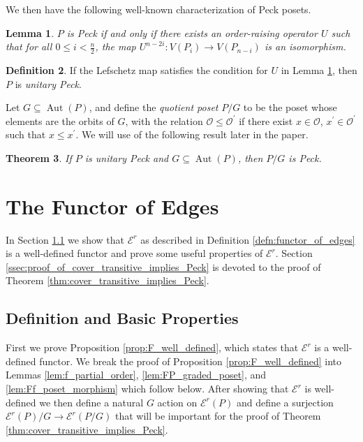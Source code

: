 \documentclass[10 pt]{amsart}
\theoremstyle{plain}
\newtheorem{thm}{Theorem}[section]
\newtheorem{lem}[thm]{Lemma}
\theoremstyle{definition}
\newtheorem{defn}[thm]{Definition}
\theoremstyle{remark}
\numberwithin{equation}{section}
\newcommand\ssec{\subsection}
\begin{document}
\noindent We then have the following well-known characterization of Peck posets.

\begin{lem}\label{lem:Peck_poset_characterization}
$P$ is Peck if and only if there exists an order-raising operator $U$ such that for all $0\le i < \frac{n}{2}$, the map $U^{n-2i}\colon V(P_i)\rightarrow V(P_{n-i})$ is an isomorphism.
\end{lem}

\begin{defn}
If the Lefschetz map satisfies the condition for $U$ in Lemma \ref{lem:Peck_poset_characterization}, then $P$ is \textit{unitary Peck}.
\end{defn}


Let $G\subseteq \operatorname{Aut}(P)$, and define the \textit{quotient poset} $P/G$ to be the poset whose elements are the orbits of $G$, with the relation $\mathcal{O}\le \mathcal{O}^\prime$ if there exist $x\in \mathcal{O}$, $x^\prime\in \mathcal{O}^\prime$ such that $x\le x^\prime$.  We will use of the following result later in the paper.

\begin{thm}
\label{thm:quotients_of_unitary_peck_posets}
If $P$ is unitary Peck and $G\subseteq\operatorname{Aut}(P)$, then $P/G$ is Peck.
\end{thm}



\section{The Functor of Edges}
\label{sec:functor_of_edges}

In Section \ref{ssec:definition_and_basic_properties} we show that $\mathcal E^r$ as described in Definition \ref{defn:functor_of_edges} is a well-defined functor and prove some useful properties of $\mathcal E^r$.  Section \ref{ssec:proof_of_cover_transitive_implies_Peck} is devoted to the proof of Theorem \ref{thm:cover_transitive_implies_Peck}.

\ssec{Definition and Basic Properties}\label{ssec:definition_and_basic_properties}
First we prove Proposition \ref{prop:F_well_defined}, which states that $\mathcal E^r$ is a well-defined functor.  We break the proof of Proposition \ref{prop:F_well_defined} into Lemmas \ref{lem:f_partial_order}, \ref{lem:FP_graded_poset}, and \ref{lem:Ff_poset_morphism} which follow below.  After showing that $\mathcal E^r$ is well-defined we then define a natural $G$ action on $\mathcal E^r(P)$ and define a surjection $\mathcal E^r(P)/G\rightarrow \mathcal E^r(P/G)$ that will be important for the proof of Theorem \ref{thm:cover_transitive_implies_Peck}.
\end{document}
